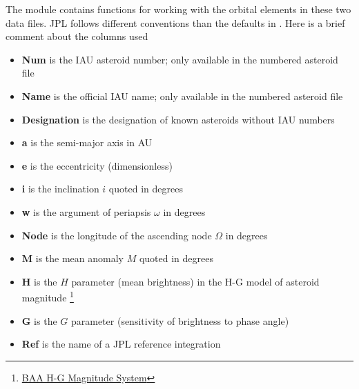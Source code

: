 The module  contains functions for working with the orbital elements in these two data files.
JPL follows different conventions than the defaults in .
Here is a brief comment about the columns used
\begin{itemize}
\item \textbf{Num} is the IAU asteroid number; only available in the numbered asteroid file
\item \textbf{Name} is the official IAU name; only available in the numbered asteroid file
\item \textbf{Designation} is the designation of known asteroids without IAU numbers
\item \textbf{a} is the semi-major axis in AU
\item \textbf{e} is the eccentricity (dimensionless)
\item \textbf{i} is the inclination $i$ quoted in degrees
\item \textbf{w} is the argument of periapsis $\omega$ in degrees
\item \textbf{Node} is the longitude of the ascending node $\Omega$ in degrees
\item \textbf{M} is the mean anomaly $M$ quoted in degrees
\item \textbf{H} is the $H$ parameter (mean brightness) in the H-G model of asteroid magnitude 
\footnote{\href{https://www.britastro.org/asteroids/dymock4.pdf}{BAA H-G Magnitude System} }
\item \textbf{G} is the $G$ parameter (sensitivity of brightness to phase angle)
\item \textbf{Ref} is the name of a JPL reference integration
\end{itemize}

